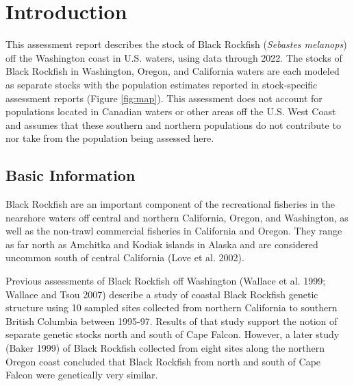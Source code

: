 \documentclass[11pt,
  english,
  letterpaper,
]{article}
\begin{document}
\vspace{500cm}

\pagebreak
\setlength{\parskip}{5mm plus1mm minus1mm}
\setcounter{page}{1}
\renewcommand{\thefigure}{\arabic{figure}}
\renewcommand{\thetable}{\arabic{table}}
\setcounter{table}{0}
\setcounter{figure}{0}

\hypertarget{introduction}{%
\section{Introduction}\label{introduction}}

This assessment report describes the stock of Black Rockfish (\emph{Sebastes melanops}) off the Washington coast in U.S. waters, using data through 2022. The stocks of Black Rockfish in Washington, Oregon, and California waters are each modeled as separate stocks with the population estimates reported in stock-specific assessment reports (Figure \ref{fig:map}). This assessment does not account for populations located in Canadian waters or other areas off the U.S. West Coast and assumes that these southern and northern populations do not contribute to nor take from the population being assessed here.

\hypertarget{basic-information}{%
\subsection{Basic Information}\label{basic-information}}

Black Rockfish are an important component of the recreational fisheries in the nearshore waters off central and northern California, Oregon, and Washington, as well as the non-trawl commercial fisheries in California and Oregon. They range as far north as Amchitka and Kodiak islands in Alaska and are considered uncommon south of central California (Love et al. 2002).

Previous assessments of Black Rockfish off Washington (Wallace et al. 1999; Wallace and Tsou 2007) describe a study of coastal Black Rockfish genetic structure using 10 sampled sites collected from northern California to southern British Columbia between 1995-97. Results of that study support the notion of separate genetic stocks north and south of Cape Falcon. However, a later study (Baker 1999) of Black Rockfish collected from eight sites along the northern Oregon coast concluded that Black Rockfish from north and south of Cape Falcon were genetically very similar.
\end{document}
